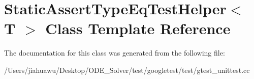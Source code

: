 \hypertarget{class_static_assert_type_eq_test_helper}{}\section{Static\+Assert\+Type\+Eq\+Test\+Helper$<$ T $>$ Class Template Reference}
\label{class_static_assert_type_eq_test_helper}


The documentation for this class was generated from the following file\+:\begin{DoxyCompactItemize}
\item 
/\+Users/jiahuawu/\+Desktop/\+O\+D\+E\+\_\+\+Solver/test/googletest/test/gtest\+\_\+unittest.\+cc\end{DoxyCompactItemize}
